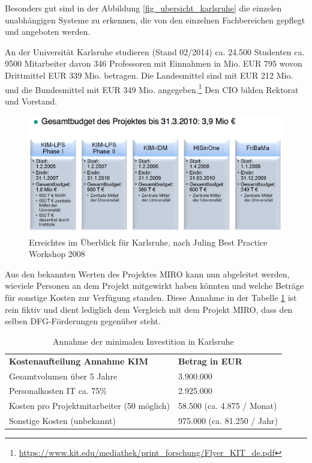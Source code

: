 Besonders gut sind in der Abbildung \ref{fig_ubersicht_karlsruhe} die einzelen unabhängigen Systeme zu erkennen, die von den einzelnen Fachbereichen gepflegt und angeboten werden. 

\newpage

An der Universität Karlsruhe studieren (Stand 02/2014) ca. 24.500 Studenten ca. 9500 Mitarbeiter davon 346 Professoren mit Einnahmen in Mio. EUR 795 wovon Drittmittel EUR 339 Mio. betragen. Die Landesmittel sind mit EUR 212 Mio. und die Bundesmittel mit EUR 349 Mio. angegeben.\footnote{\url{https://www.kit.edu/mediathek/print_forschung/Flyer_KIT_de.pdf}} Den CIO bilden Rektorat und Vorstand.

\begin{figure}[h!]
	\centering
	\includegraphics[width=\textwidth]
	{kapitel/gruppe4_2/bilder/uberblick_projekt_KIM}
	\caption{Erreichtes im Überblick für Karlsruhe, nach Juling Best Practice Workshop 2008}
	\label{fig_uberblick_projekt_KIM}
\end{figure}

Aus den bekannten Werten des Projektes MIRO kann nun abgeleitet werden, wieviele Personen an dem Projekt mitgewirkt haben könnten und welche Beträge für sonstige Kosten zur Verfügung standen. Diese Annahme in der Tabelle \ref{tab_minimale_investition_karlsruhe} ist rein fiktiv und dient lediglich dem Vergleich mit dem Projekt MIRO, dass den selben DFG-Förderungen gegenüber steht.

\begin{table}[h!]
	\begin{tabularx}{\textwidth}{l|l}
		\hline
		\textbf{Kostenaufteilung Annahme KIM} & \textbf{Betrag in EUR}\\
		Gesamtvolumen über 5 Jahre & 3.900.000\\
		Personalkosten IT ca. 75\% & 2.925.000\\
		Kosten pro Projektmitarbeiter (50 möglich) & 58.500 (ca. 4.875 / Monat)\\ 
		Sonstige Kosten (unbekannt) & 975.000 (ca. 81.250 / Jahr)\\
		\hline
	\end{tabularx}
	\caption{Annahme der minimalen Investition in Karlsruhe}
	\label{tab_minimale_investition_karlsruhe}
\end{table}

